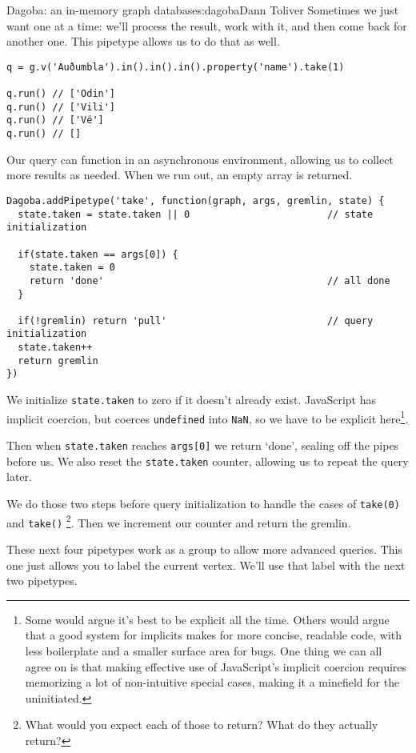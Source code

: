 \begin{aosachapter}{Dagoba: an in-memory graph database}{s:dagoba}{Dann Toliver}
Sometimes we just want one at a time: we'll process the result, work
with it, and then come back for another one. This pipetype allows us to
do that as well.

\begin{verbatim}
q = g.v('Auðumbla').in().in().in().property('name').take(1)

q.run() // ['Odin']
q.run() // ['Vili']
q.run() // ['Vé']
q.run() // []
\end{verbatim}

Our query can function in an asynchronous environment, allowing us to
collect more results as needed. When we run out, an empty array is
returned.

\begin{verbatim}
Dagoba.addPipetype('take', function(graph, args, gremlin, state) {
  state.taken = state.taken || 0                        // state initialization
  
  if(state.taken == args[0]) {
    state.taken = 0
    return 'done'                                       // all done
  }
  
  if(!gremlin) return 'pull'                            // query initialization
  state.taken++
  return gremlin
})
\end{verbatim}

We initialize \texttt{state.taken} to zero if it doesn't already exist.
JavaScript has implicit coercion, but coerces \texttt{undefined} into
\texttt{NaN}, so we have to be explicit here\footnote{Some would argue
  it's best to be explicit all the time. Others would argue that a good
  system for implicits makes for more concise, readable code, with less
  boilerplate and a smaller surface area for bugs. One thing we can all
  agree on is that making effective use of JavaScript's implicit
  coercion requires memorizing a lot of non-intuitive special cases,
  making it a minefield for the uninitiated.}.

Then when \texttt{state.taken} reaches \texttt{args{[}0{]}} we return
`done', sealing off the pipes before us. We also reset the
\texttt{state.taken} counter, allowing us to repeat the query later.

We do those two steps before query initialization to handle the cases of
\texttt{take(0)} and \texttt{take()} \footnote{What would you expect
  each of those to return? What do they actually return?}. Then we
increment our counter and return the gremlin.

\label{as}

These next four pipetypes work as a group to allow more advanced
queries. This one just allows you to label the current vertex. We'll use
that label with the next two pipetypes.


\end{aosachapter}
